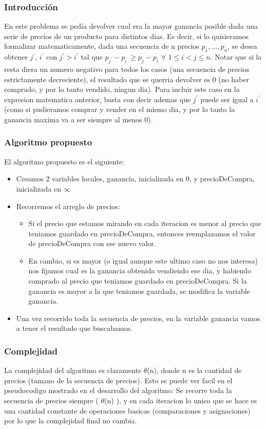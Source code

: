 \documentclass[12pt, a4paper,english,spanish]{article}
\begin{document}
\subsubsection*{Introducci\'on}
En este problema se ped\'ia devolver cual era la mayor ganancia posible dada una serie de precios de un producto para distintos dias. Es decir, si lo quisieramos formalizar matematicamente, dada una secuencia de n precios $p_{1}, ... , p_{n}$, se desea obtener $j^{\prime}$, $i^{\prime}$ con $j^{\prime} >  i^{\prime}$ tal que $p_{j^{\prime}} - p_{i^{\prime}} \geq p_{j} - p_{i}$  $\forall$  $1 \le i < j \le n$. Notar que si la resta diera un numero negativo para todos los casos (una secuencia de precios estrictamente decreciente), el resultado que se querria devolver es 0 (no haber comprado, y por lo tanto vendido, ningun dia). Para incluir este caso en la expresion matematica anterior, basta con decir ademas que $ j^{\prime}$ puede ser igual a $i^{\prime}$ (como si pudieramos comprar y vender en el mismo dia, y por lo tanto la ganancia maxima va a ser siempre al menos 0).
\subsubsection*{Algoritmo propuesto}
 
El algoritmo propuesto es el siguiente:
\begin{itemize}
\item Creamos 2 variables locales, ganancia, inicializada en 0, y precioDeCompra, inicializada en $\infty$
\item Recorremos el arreglo de precios:
\begin{itemize}
\item Si el precio que estamos mirando en cada iteracion es menor al precio que teniamos guardado en precioDeCompra, entonces reemplazamos el valor de precioDeCompra con ese nuevo valor.
\item En cambio, si es mayor (o igual aunque este ultimo caso no nos interesa) nos fijamos cual es la ganancia obtenida vendiendo ese dia, y habiendo comprado al precio que teniamos guardado en precioDeCompra. Si la ganancia es mayor a la que teniamos guardada, se modifica la variable ganancia.
\end{itemize}
\item Una vez recorrido toda la secuencia de precios, en la variable ganancia vamos a tener el resultado que buscabamos.
\end{itemize}
\subsubsection*{Complejidad}
La complejidad del algoritmo es claramente $\theta$(n), donde n es la cantidad de precios (tamano de la secuencia de precios). Esto se puede ver facil en el pseudocodigo mostrado en el desarrollo del algoritmo: Se recorre toda la secuencia de precios siempre ( $\theta$(n) ), y en cada iteracion lo unico que se hace es una cantidad constante de operaciones basicas (comparaciones y asignaciones) por lo que la complejidad final no cambia. 
\end{document}
